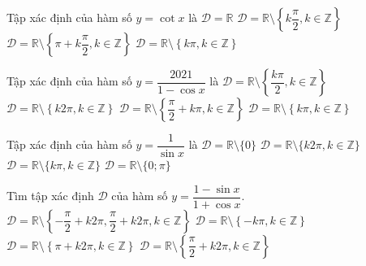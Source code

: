 \begin{ex}%
	Tập xác định  của hàm số $y=\cot x$ là
	\choice 
		 {$\mathscr{D}=\mathbb{R}$}
		{$\mathscr{D}=\mathbb{R}\setminus \left\{k\dfrac{\pi}{2},k\in \mathbb{Z}  \right\}$}
		{$\mathscr{D}=\mathbb{R}\setminus  \left\{\pi+k\dfrac{\pi}{2},k\in \mathbb{Z}\right\}$}
		{\True $\mathscr{D}=\mathbb{R}\setminus \left\{k\pi,k\in  \mathbb{Z}\right\}$}
\end{ex}

\begin{ex}%
	Tập xác định của hàm số $y=\dfrac{2021}{1-\cos  x}$ là
	\choice 
		{$\mathscr{D}=\mathbb{R}\setminus\left\{\dfrac{k\pi}{2} ,k\in\mathbb{Z}\right\}$} 
		{\True $\mathscr{D}=\mathbb{R}\setminus\left\{k2\pi ,k\in\mathbb{Z}\right\}$} 
		{$\mathscr{D}=\mathbb{R}\setminus\left\{\dfrac{\pi}{2}+k\pi ,k\in\mathbb{Z}\right\}$} 
		{$\mathscr{D}=\mathbb{R}\setminus\left\{k\pi ,k\in\mathbb{Z}\right\}$} 
\end{ex}

\begin{ex}%
	Tập xác định của hàm số  $y=\dfrac{1}{\sin x}$ là
	\choice 
		 {$\mathscr{D}=\mathbb{R}\setminus\{0\}$}
		{$\mathscr{D}=\mathbb{R}\setminus\{k2\pi  ,k\in\mathbb{Z}\}$}
		{\True  $\mathscr{D}=\mathbb{R}\setminus\{k\pi ,k\in\mathbb{Z}\}$}
		{$\mathscr{D}=\mathbb{R}\setminus\{0;\pi\}$} 
\end{ex}

\begin{ex}%
	Tìm tập xác định $\mathscr{D}$ của hàm số $y=\dfrac{1-\sin  x}{1+\cos x}$.
	\choice 
		{$\mathscr{D}=\mathbb{R}\setminus\left\{-\dfrac{\pi}{2}+k2\pi  ,\dfrac{\pi}{2}+k2\pi ,k\in\mathbb{Z}\right\}$}
		 {$\mathscr{D}=\mathbb{R}\setminus\left\{-k\pi ,k\in\mathbb{Z}\right\}$}
		{\True $\mathscr{D}=\mathbb{R}\setminus\left\{\pi +k2\pi ,k\in\mathbb{Z}\right\}$} 
		{$\mathscr{D}=\mathbb{R}\setminus\left\{ \dfrac{\pi}{2}+k2\pi,k\in\mathbb{Z}\right\}$} 
\end{ex}

